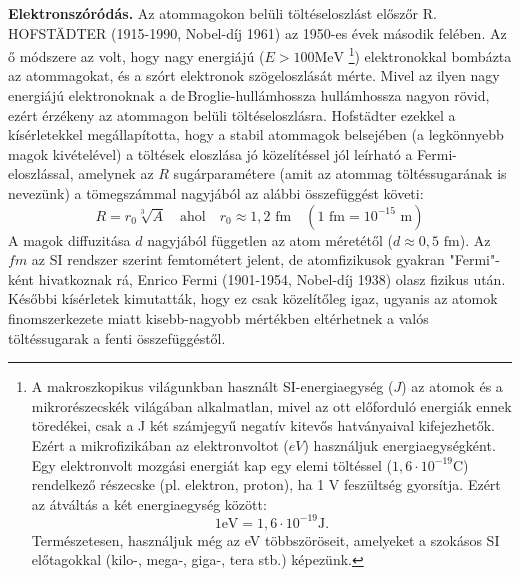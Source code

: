 \documentclass[../main.tex]{subfiles}
\begin{document}
\textbf{Elektronszóródás.} Az atommagokon belüli töltéseloszlást előszőr R. HOFSTÄDTER (1915-1990, Nobel-díj 1961) az 1950-es évek második felében.
Az ő módszere az volt, hogy nagy energiájú ($E > 100 \text{MeV}$
\footnote{
    A makroszkopikus világunkban használt SI-energiaegység ($J$) az atomok és a mikrorészecskék világában alkalmatlan, mivel az ott előforduló energiák ennek
töredékei, csak a J két számjegyű negatív kitevős hatványaival kifejezhetők. Ezért a
mikrofizikában az elektronvoltot ($eV$) használjuk energiaegységként. Egy elektronvolt
mozgási energiát kap egy elemi töltéssel ($1,6 \cdot 10^{-19} \text{C}$) rendelkező részecske (pl. elektron,
proton), ha 1 V feszültség gyorsítja. Ezért az átváltás a két energiaegység között:
\begin{equation*}
1 \text{eV} = 1,6 \cdot 10^{-19} \text{J}.
\end{equation*}
Természetesen, használjuk még az eV többszöröseit, amelyeket a szokásos SI előtagokkal
(kilo-, mega-, giga-, tera stb.) képezünk.
})
elektronokkal bombázta az atommagokat, és a szórt elektronok szögeloszlását mérte. Mivel az ilyen nagy energiájú elektronoknak a de\,Broglie-hullámhossza hullámhossza nagyon rövid,
ezért érzékeny az atommagon belüli töltéseloszlásra. Hofstädter ezekkel a kísérletekkel megállapította, hogy a stabil atommagok belsejében (a legkönnyebb magok kivételével)
a töltések eloszlása jó közelítéssel jól leírható a Fermi-eloszlással, amelynek az $R$ sugárparamétere (amit az atommag töltéssugarának is nevezünk) a tömegszámmal nagyjából az alábbi összefüggést követi:
\begin{equation}
R = r_0 \sqrt[3]{A} \quad \text{ahol} \quad r_0 \approx 1,2 \text{ fm} \quad (1 \text{ fm} = 10^{-15} \text{ m})
\end{equation}
A magok diffuzitása $d$ nagyjából független az atom méretétől ($d \approx 0,5 \text{ fm}$). Az $fm$ az SI rendszer szerint femtométert jelent, de atomfizikusok gyakran "Fermi"-ként hivatkoznak rá,
Enrico Fermi (1901-1954, Nobel-díj 1938) olasz fizikus után.
Későbbi kísérletek kimutatták, hogy ez csak közelítőleg igaz, ugyanis az atomok finomszerkezete miatt kisebb-nagyobb mértékben eltérhetnek a valós töltéssugarak a fenti összefüggéstől.
\end{document}
